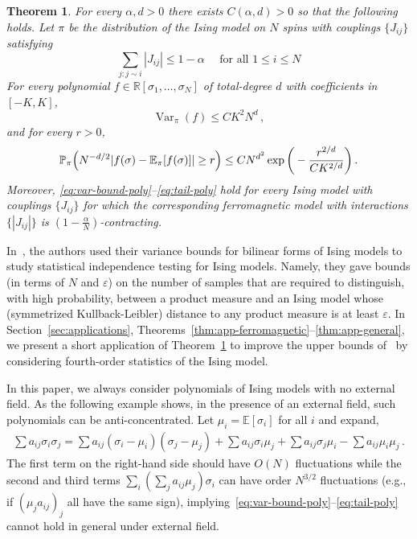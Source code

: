 \documentclass[reqno,11pt]{amsart}
\numberwithin{equation}{section}
\renewcommand{\epsilon}{\varepsilon}
\newtheorem{maintheorem}{Theorem}
\theoremstyle{definition}{
\newtheorem{example}[theorem]{Example}
\newtheorem{definition}[theorem]{Definition}
\newtheorem*{definition*}{Definition}
\newtheorem{problem}[theorem]{Problem}
\newtheorem{question}[theorem]{Question}
\newtheorem{remark}[theorem]{Remark}
}
\newcommand{\E}{\mathbb E}
\renewcommand{\P}{\mathbb P}
\newcommand{\R}{\mathbb R}
\renewcommand{\epsilon}{\varepsilon}
\DeclareMathOperator{\var}{Var}
\begin{document}
\begin{maintheorem}\label{mainthm:polynomials}
For every $\alpha,d>0$ there exists  $C(\alpha,d)>0$ so that the following holds. 
Let 
 $\pi$ be the distribution of the Ising model on $N$ spins with couplings $\{J_{i j}\}$ satisfying
 \begin{equation}\label{eq:dobrushin} \sum_{j: j\sim i} |J_{ij}| \leq {1-\alpha}\quad\mbox{ for all $1 \leq i\leq N$}\end{equation}
 For every polynomial $f\in\R[\sigma_1,\ldots,\sigma_N]$ of total-degree $d$ with coefficients in $[-K,K]$,
\begin{equation}\label{eq:var-bound-poly}
 \var_\pi(f) \leq  C K^2 N^d \,, 	
\end{equation}
and for every $r>0$,
\begin{equation}\label{eq:tail-poly}\P_{\pi}\Bigl(N^{-d/2} |f(\sigma)-\E_{\pi} [f(\sigma)]|\geq r \Bigr) \leq C  N^{d^2} \exp\bigg(-\frac {r^{2/d}}{C K^{2/d}}\bigg)\,.
\end{equation}
Moreover, \eqref{eq:var-bound-poly}--\eqref{eq:tail-poly} hold for every Ising model with couplings $\{J_{ij}\}$ for which the corresponding ferromagnetic model with interactions $\{|J_{ij}|\}$ is $(1-\tfrac \alpha N)$-contracting. 
\end{maintheorem}

\begin{remark}
In~\cite{DDK}, the authors used their variance bounds for bilinear forms of Ising models to study statistical independence testing for Ising models. Namely, they gave bounds (in terms of $N$ and $\epsilon$) on the number of samples that are required to distinguish, with high probability, between a product measure and an Ising model whose (symmetrized Kullback-Leibler) distance to any product measure is at least $\epsilon$.  In Section~\ref{sec:applications}, Theorems~\ref{thm:app-ferromagnetic}--\ref{thm:app-general}, we present a short application of Theorem~\ref{mainthm:polynomials} to improve the upper bounds of~\cite{DDK} by considering fourth-order statistics of the Ising model.  
\end{remark}

\begin{remark}
In this paper, we always consider polynomials of Ising models with no external field. As the following example shows, in the presence of an external field, such polynomials  can be anti-concentrated. Let $\mu_i = \mathbb E[\sigma_i]$ for all $i$ and expand,
\begin{align*}
\sum a_{ij} \sigma_i \sigma_j = \sum a_{ij}(\sigma_i - \mu_i)(\sigma_j - \mu_j) + \sum a_{ij} \sigma_i \mu_j +\sum a_{ij} \sigma_j \mu_i - \sum a_{ij} \mu_i \mu_j\,.
\end{align*}
The first term on the right-hand side should have $O(N)$ fluctuations while the second and third terms $ \sum_i (\sum_{j} a_{ij} \mu_j)\sigma_i$ can have order $N^{3/2}$ fluctuations (e.g., if $(\mu_j a_{ij})_j$ all have the same sign), implying~\eqref{eq:var-bound-poly}--\eqref{eq:tail-poly} cannot hold in general under external field. 
\end{remark}
\end{document}
